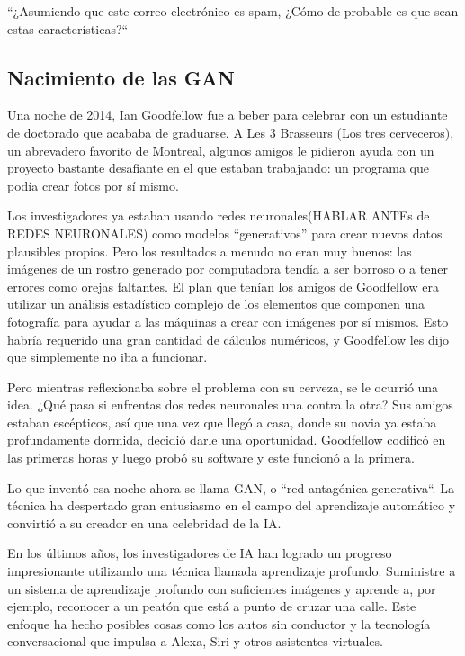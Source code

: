 \documentclass[a4paper]{article}
\begin{document}
``¿Asumiendo que este correo electrónico es spam, ¿Cómo de 
probable es que sean estas características?``

\subsection{Nacimiento de las GAN}
Una noche de 2014, Ian Goodfellow fue a beber para celebrar con un 
estudiante de doctorado que acababa de graduarse. A
Les 3 Brasseurs (Los tres cerveceros), un abrevadero favorito de 
Montreal, algunos amigos le pidieron ayuda con un proyecto 
bastante desafiante en el que estaban trabajando: un programa que 
podía crear fotos por sí mismo.

Los investigadores ya estaban usando redes neuronales(HABLAR ANTEs 
de REDES NEURONALES) como
modelos “generativos” para crear nuevos datos plausibles propios. 
Pero los resultados a menudo no eran muy buenos: las imágenes de 
un rostro generado por computadora tendía a ser borroso o a tener 
errores como orejas faltantes. El plan que tenían los amigos de 
Goodfellow era utilizar un análisis estadístico complejo de los 
elementos que componen una fotografía para ayudar a las máquinas a 
crear
con imágenes por sí mismos. Esto habría requerido una gran 
cantidad de cálculos numéricos, y Goodfellow les dijo que
simplemente no iba a funcionar.

Pero mientras reflexionaba sobre el problema con su cerveza, se le 
ocurrió una idea. ¿Qué pasa si enfrentas dos redes neuronales una 
contra la otra? Sus amigos estaban escépticos, así que una vez que 
llegó a casa, donde su novia ya estaba profundamente dormida, 
decidió
darle una oportunidad. Goodfellow codificó en las primeras horas y 
luego probó su software y este funcionó a la primera.

Lo que inventó esa noche ahora se llama GAN, o ``red antagónica 
generativa``. La técnica ha despertado gran
entusiasmo en el campo del aprendizaje automático y convirtió a su 
creador en una celebridad de la IA.

En los últimos años, los investigadores de IA han logrado un 
progreso impresionante utilizando una técnica llamada aprendizaje 
profundo. Suministre a un
sistema de aprendizaje profundo con suficientes imágenes y aprende 
a, por ejemplo, reconocer a un peatón que está a punto de cruzar 
una calle. Este enfoque ha hecho posibles cosas como los autos sin 
conductor y la tecnología conversacional que impulsa a Alexa, Siri 
y otros asistentes virtuales.
\end{document}
